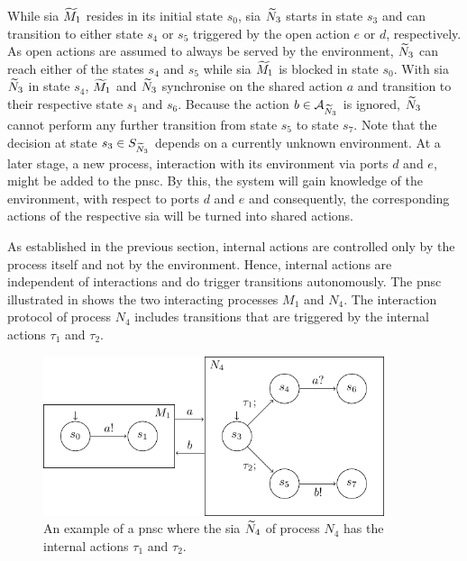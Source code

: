 While \gls{sia} $\widetilde{M}_1$ resides in its initial state $s_0$, \gls{sia} $\widetilde{N}_3$ starts in state $s_3$ and can transition to either state $s_4$ or $s_5$ triggered by the open action $e$ or $d$, respectively.
As open actions are assumed to always be served by the environment, $\widetilde{N}_3$ can reach either of the states $s_4$ and $s_5$ while \gls{sia} $\widetilde{M}_1$ is blocked in state $s_0$.
With \gls{sia} $\widetilde{N}_3$ in state $s_4$, $\widetilde{M}_1$ and $\widetilde{N}_3$ synchronise on the shared action $a$ and transition to their respective state $s_1$ and $s_6$.
Because the action $b \in \mathcal{A}_{\widetilde{N}_3}$ is ignored, $\widetilde{N}_3$ cannot perform any further transition from state $s_5$ to state $s_7$.
Note that the decision at state $s_3 \in S_{\widetilde{N}_3}$ depends on a currently unknown environment.
At a later stage, a new process, interaction with its environment via ports $d$ and $e$, might be added to the \gls{pnsc}.
By this, the system will gain knowledge of the environment, with respect to ports $d$ and $e$ and consequently, the corresponding actions of the respective \gls{sia} will be turned into shared actions.

As established in the previous section, internal actions are controlled only by the process itself and not by the environment.
Hence, internal actions are independent of interactions and do trigger transitions autonomously.
The \gls{pnsc} illustrated in \Fig{\ref{fig_sia_control_internal}} shows the two interacting processes $M_1$ and $N_4$.
The interaction protocol of process $N_4$ includes transitions that are triggered by the internal actions $\tau_1$ and $\tau_2$.
\begin{figure}[bht]
    \TopFigSpace
    \centering
    \includegraphics[width=10cm]{fig/sia_control_internal.pdf}
    \CaptionFigSpace
    \caption{An example of a \gls{pnsc} where the \gls{sia} $\widetilde{N}_4$ of process $N_4$ has the internal actions $\tau_1$ and $\tau_2$.}
    \label{fig_sia_control_internal}
    \BotFigSpace
\end{figure}

